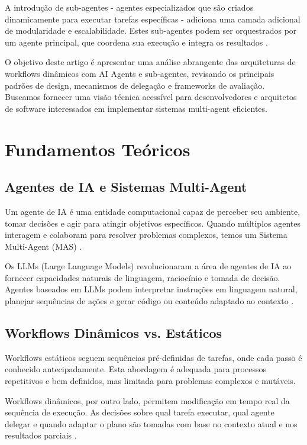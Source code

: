 \documentclass[OA,linenum]{InterPore}
\begin{document}
A introdução de sub-agentes - agentes especializados que são criados dinamicamente para executar tarefas específicas - adiciona uma camada adicional de modularidade e escalabilidade. Estes sub-agentes podem ser orquestrados por um agente principal, que coordena sua execução e integra os resultados \cite{tomasev2026}.

O objetivo deste artigo é apresentar uma análise abrangente das arquiteturas de workflows dinâmicos com AI Agents e sub-agentes, revisando os principais padrões de design, mecanismos de delegação e frameworks de avaliação. Buscamos fornecer uma visão técnica acessível para desenvolvedores e arquitetos de software interessados em implementar sistemas multi-agent eficientes.

\section{Fundamentos Teóricos}

\subsection{Agentes de IA e Sistemas Multi-Agent}

Um agente de IA é uma entidade computacional capaz de perceber seu ambiente, tomar decisões e agir para atingir objetivos específicos. Quando múltiplos agentes interagem e colaboram para resolver problemas complexos, temos um Sistema Multi-Agent (MAS) \cite{li2024}.

Os LLMs (Large Language Models) revolucionaram a área de agentes de IA ao fornecer capacidades naturais de linguagem, raciocínio e tomada de decisão. Agentes baseados em LLMs podem interpretar instruções em linguagem natural, planejar sequências de ações e gerar código ou conteúdo adaptado ao contexto \cite{ahmad2026}.

\subsection{Workflows Dinâmicos vs. Estáticos}

Workflows estáticos seguem sequências pré-definidas de tarefas, onde cada passo é conhecido antecipadamente. Esta abordagem é adequada para processos repetitivos e bem definidos, mas limitada para problemas complexos e mutáveis.

Workflows dinâmicos, por outro lado, permitem modificação em tempo real da sequência de execução. As decisões sobre qual tarefa executar, qual agente delegar e quando adaptar o plano são tomadas com base no contexto atual e nos resultados parciais \cite{yue2026}.
\end{document}
